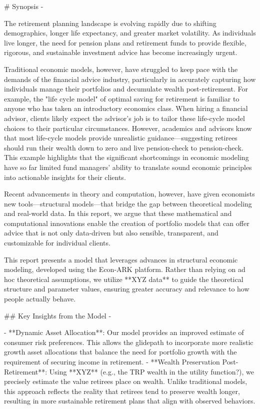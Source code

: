 
# Synopsis {-}

The retirement planning landscape is evolving rapidly due to shifting demographics, longer life expectancy, and greater market volatility. As individuals live longer, the need for pension plans and retirement funds to provide flexible, rigorous, and sustainable investment advice has become increasingly urgent.

Traditional economic models, however, have struggled to keep pace with the demands of the financial advice industry, particularly in accurately capturing how individuals manage their portfolios and decumulate wealth post-retirement. For example, the "life cycle model" of optimal saving for retirement is familiar to anyone who has taken an introductory economics class. When hiring a financial advisor, clients likely expect the advisor's job is to tailor these life-cycle model choices to their particular circumstances. However, academics and advisors know that most life-cycle models provide unrealistic guidance—suggesting retirees should run their wealth down to zero and live pension-check to pension-check. This example highlights that the significant shortcomings in economic modeling have so far limited fund managers' ability to translate sound economic principles into actionable insights for their clients.

Recent advancements in theory and computation, however, have given economists new tools—structural models—that bridge the gap between theoretical modeling and real-world data. In this report, we argue that these mathematical and computational innovations enable the creation of portfolio models that can offer advice that is not only data-driven but also sensible, transparent, and customizable for individual clients.

This report presents a model that leverages advances in structural economic modeling, developed using the Econ-ARK platform. Rather than relying on ad hoc theoretical assumptions, we utilize **XYZ data** to guide the theoretical structure and parameter values, ensuring greater accuracy and relevance to how people actually behave. 

## Key Insights from the Model {-}

- **Dynamic Asset Allocation**: Our model provides an improved estimate of consumer risk preferences. This allows the glidepath to incorporate more realistic growth asset allocations that balance the need for portfolio growth with the requirement of securing income in retirement.
- **Wealth Preservation Post-Retirement**: Using **XYZ** (e.g., the TRP wealth in the utility function?), we precisely estimate the value retirees place on wealth. Unlike traditional models, this approach reflects the reality that retirees tend to preserve wealth longer, resulting in more sustainable retirement plans that align with observed behaviors.

